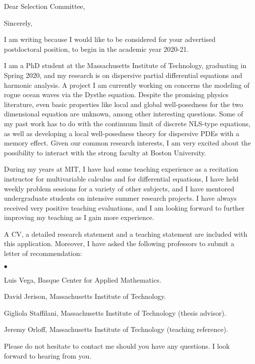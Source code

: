 %
%

\date{\today}
\opening{Dear Selection Committee,}
\closing{Sincerely,}
\makelettertitle

\justifying 

I am writing because I would like to be considered for your advertised postdoctoral position, to begin in the academic year 2020-21.

I am a PhD student at the Massachusetts Institute of Technology, graduating in Spring 2020, and my research is on dispersive partial differential equations and harmonic analysis. A project I am currently working on concerns the modeling of rogue ocean waves via the Dysthe equation. Despite the promising physics literature, even basic properties like local and global well-posedness for the two dimensional equation are unknown, among other interesting questions. Some of my past work has to do with the continuum limit of discrete NLS-type equations, as well as developing a local well-posedness theory for dispersive PDEs with a memory effect. Given our common research interests, I am very excited about the possibility to interact with the strong faculty at Boston University.

During my years at MIT, I have had some teaching experience as a recitation instructor for multivariable calculus and for differential equations, I have held weekly problem sessions for a variety of other subjects, and I have mentored undergraduate students on intensive summer research projects. I have always received very positive teaching evaluations, and I am looking forward to further improving my teaching as I gain more experience.

A CV, a detailed research statement and a teaching statement are included with this application. Moreover, I have asked the following professors to submit a letter of recommendation:
\begin{list}{$\bullet$}{}
\item Luis Vega, Basque Center for Applied Mathematics.
\item David Jerison, Massachusetts Institute of Technology.
\item Gigliola Staffilani, Massachusetts Institute of Technology (thesis advisor). 
\item Jeremy Orloff, Massachusetts Institute of Technology (teaching reference).
\end{list}

Please do not hesitate to contact me should you have any questions. I look forward to hearing from you.

\hspace{1.5cm}

\makeletterclosing

\clearpage

